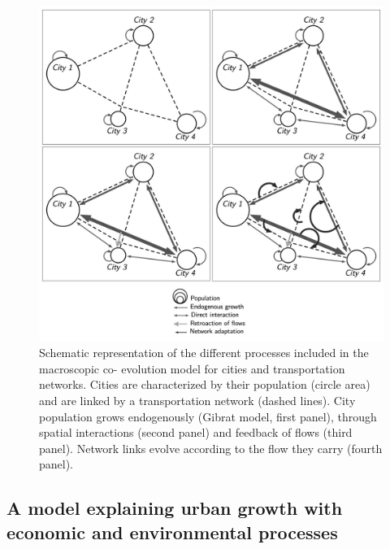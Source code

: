 \documentclass[10pt,letterpaper]{article}
\begin{document}
\begin{figure}
	\includegraphics[width=\linewidth]{Fig1.jpg}
	\caption{Schematic representation of the different processes included in the macroscopic co- evolution model for cities and transportation networks. Cities are characterized by their population (circle area) and are linked by a transportation network (dashed lines). City population grows endogenously (Gibrat model, first panel), through spatial interactions (second panel) and feedback of flows (third panel). Network links evolve according to the flow they carry (fourth panel).\label{fig:fig1}}	
\end{figure}




\subsection{A model explaining urban growth with economic and environmental processes}
\end{document}
